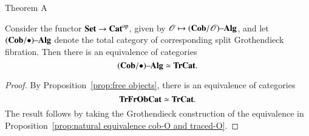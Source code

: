 \documentclass[12pt,oneside,article,draft]{memoir}
\begin{document}
%
%
%
\begin{named}{Theorem A}\label{thm:Theorem A}

Consider the functor $\mathbf{Set}\to{\mathbf{Cat}}^{\text{op}}$, given by $\mathscr{O}\mapsto(\mathbf{Cob}/\mathscr{O}){\text \textendash}\mathbf{Alg}$, and let $(\mathbf{Cob}/\bullet){\text \textendash}\mathbf{Alg}$ denote the total category of corresponding split Grothendieck fibration. Then there is an equivalence of categories
$$(\mathbf{Cob}/\bullet){\text \textendash}\mathbf{Alg}\simeq\mathbf{TrCat}.$$

\end{named}

\begin{proof}

By Proposition~\ref{prop:free objects}, there is an equivalence of categories 
$$\mathbf{TrFrObCat}\simeq\mathbf{TrCat}.$$ 
The result follows by taking the Grothendieck construction of the equivalence in Proposition~\ref{prop:natural equivalence cob-O and traced-O}.

\end{proof}
\end{document}

